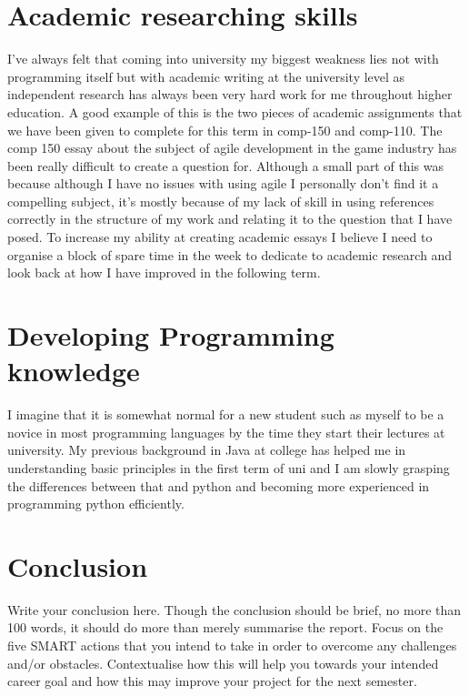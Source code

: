 \documentclass{scrartcl}
\begin{document}
\section{Academic researching skills}

I've always felt that coming into university my biggest weakness lies not with programming itself but with academic writing at the university level as independent research has always been very hard work for me throughout higher education. A good example of this is the two pieces of academic assignments that we have been given to complete for this term in comp-150 and comp-110. The comp 150 essay about the subject of agile development in the game industry has been really difficult to create a question for. Although a small part of this was because although I have no issues with using agile I personally don't find it a compelling subject, it's mostly because of my lack of skill in using references correctly in the structure of my work and relating it to the question that I have posed. To increase my ability at creating academic essays I believe I need to organise a block of spare time in the week to dedicate to academic research and look back at how I have improved in the following term.
\section{Developing Programming knowledge}

I imagine that it is somewhat normal for a new student such as myself to be a novice in most programming languages by the time they start their lectures at university. My previous background in Java at college has helped me in understanding basic principles in the first term of uni and I am slowly grasping the differences between that and python and becoming more experienced in programming python efficiently.  


\section{Conclusion}

Write your conclusion here. Though the conclusion should be brief, no more than 100 words, it should do more than merely summarise the report. Focus on the five SMART actions that you intend to take in order to overcome any challenges and/or obstacles. Contextualise how this will help you towards your intended career goal and how this may improve your project for the next semester.



\end{document}
